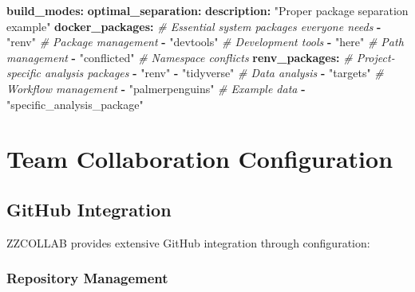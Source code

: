 \documentclass[
]{article}
\newenvironment{Shaded}{\begin{snugshade}}{\end{snugshade}}
\newcommand{\AttributeTok}[1]{\textcolor[rgb]{0.13,0.29,0.53}{#1}}
\newcommand{\CommentTok}[1]{\textcolor[rgb]{0.56,0.35,0.01}{\textit{#1}}}
\newcommand{\FunctionTok}[1]{\textcolor[rgb]{0.13,0.29,0.53}{\textbf{#1}}}
\newcommand{\KeywordTok}[1]{\textcolor[rgb]{0.13,0.29,0.53}{\textbf{#1}}}
\newcommand{\StringTok}[1]{\textcolor[rgb]{0.31,0.60,0.02}{#1}}
\begin{document}
\begin{Shaded}
\begin{Highlighting}[]
\FunctionTok{build\_modes}\KeywordTok{:}
\AttributeTok{  }\FunctionTok{optimal\_separation}\KeywordTok{:}
\AttributeTok{    }\FunctionTok{description}\KeywordTok{:}\AttributeTok{ }\StringTok{"Proper package separation example"}
\AttributeTok{    }\FunctionTok{docker\_packages}\KeywordTok{:}
\CommentTok{      \# Essential system packages everyone needs}
\AttributeTok{      }\KeywordTok{{-}}\AttributeTok{ }\StringTok{"renv"}\CommentTok{          \# Package management}
\AttributeTok{      }\KeywordTok{{-}}\AttributeTok{ }\StringTok{"devtools"}\CommentTok{      \# Development tools}
\AttributeTok{      }\KeywordTok{{-}}\AttributeTok{ }\StringTok{"here"}\CommentTok{          \# Path management}
\AttributeTok{      }\KeywordTok{{-}}\AttributeTok{ }\StringTok{"conflicted"}\CommentTok{    \# Namespace conflicts}
\AttributeTok{    }\FunctionTok{renv\_packages}\KeywordTok{:}
\CommentTok{      \# Project{-}specific analysis packages}
\AttributeTok{      }\KeywordTok{{-}}\AttributeTok{ }\StringTok{"renv"}
\AttributeTok{      }\KeywordTok{{-}}\AttributeTok{ }\StringTok{"tidyverse"}\CommentTok{     \# Data analysis}
\AttributeTok{      }\KeywordTok{{-}}\AttributeTok{ }\StringTok{"targets"}\CommentTok{       \# Workflow management}
\AttributeTok{      }\KeywordTok{{-}}\AttributeTok{ }\StringTok{"palmerpenguins"}\CommentTok{ \# Example data}
\AttributeTok{      }\KeywordTok{{-}}\AttributeTok{ }\StringTok{"specific\_analysis\_package"}
\end{Highlighting}
\end{Shaded}

\section{Team Collaboration
Configuration}\label{team-collaboration-configuration}

\subsection{GitHub Integration}\label{github-integration}

ZZCOLLAB provides extensive GitHub integration through configuration:

\subsubsection{Repository Management}\label{repository-management}
\end{document}
